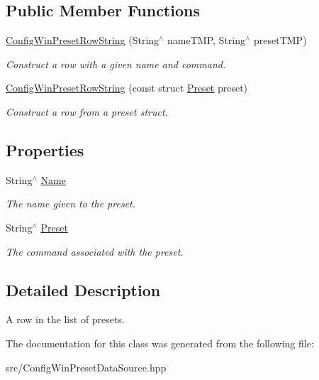 \subsection*{Public Member Functions}
\begin{DoxyCompactItemize}
\item 
\mbox{\label{classConfigWinPresetRowString_a2871b4929cbecec8e112558ff665deba}} 
\hyperlink{classConfigWinPresetRowString_a2871b4929cbecec8e112558ff665deba}{Config\+Win\+Preset\+Row\+String} (String$^\wedge$ name\+T\+MP, String$^\wedge$ preset\+T\+MP)
\begin{DoxyCompactList}\small\item\em Construct a row with a given name and command. \end{DoxyCompactList}\item 
\mbox{\label{classConfigWinPresetRowString_a1178618ba4646cb9ee0e15f17ee72765}} 
\hyperlink{classConfigWinPresetRowString_a1178618ba4646cb9ee0e15f17ee72765}{Config\+Win\+Preset\+Row\+String} (const struct \hyperlink{structPreset}{Preset} preset)
\begin{DoxyCompactList}\small\item\em Construct a row from a preset struct. \end{DoxyCompactList}\end{DoxyCompactItemize}
\subsection*{Properties}
\begin{DoxyCompactItemize}
\item 
\mbox{\label{classConfigWinPresetRowString_a0cdef9b0f258405fac95cfcc9cf80fcb}} 
String$^\wedge$ \hyperlink{classConfigWinPresetRowString_a0cdef9b0f258405fac95cfcc9cf80fcb}{Name}
\begin{DoxyCompactList}\small\item\em The name given to the preset. \end{DoxyCompactList}\item 
\mbox{\label{classConfigWinPresetRowString_a34edda87e11678d1fb024c4be4477011}} 
String$^\wedge$ \hyperlink{classConfigWinPresetRowString_a34edda87e11678d1fb024c4be4477011}{Preset}
\begin{DoxyCompactList}\small\item\em The command associated with the preset. \end{DoxyCompactList}\end{DoxyCompactItemize}


\subsection{Detailed Description}
A row in the list of presets. 

The documentation for this class was generated from the following file\+:\begin{DoxyCompactItemize}
\item 
src/Config\+Win\+Preset\+Data\+Source.\+hpp\end{DoxyCompactItemize}

